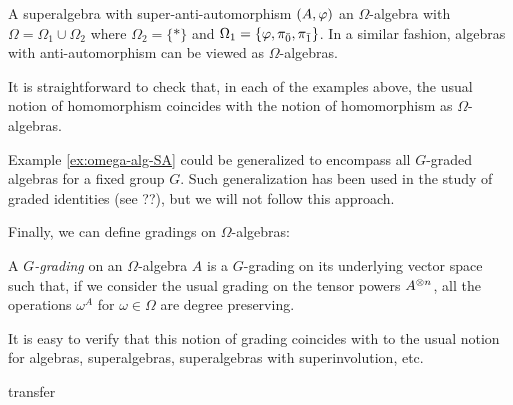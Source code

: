 
\begin{ex}
	A superalgebra with super-anti-automorphism $(A, \varphi)$ an $\Omega$-algebra with $\Omega = \Omega_1 \cup \Omega_2$ where $\Omega_2 = \{ * \}$ and $\Omega_1 = \{ \varphi, \pi_{\bar 0}, \pi_{\bar 1} \}$.
	In a similar fashion, algebras with anti-automorphism can be viewed as $\Omega$-algebras.
\end{ex}

It is straightforward to check that, in each of the examples above, the usual notion of homomorphism coincides with the notion of homomorphism as $\Omega$-algebras.

\begin{remark}
	Example \ref{ex:omega-alg-SA} could be generalized to encompass all $G$-graded algebras for a fixed group $G$.
	Such generalization has been used in the study of graded identities (see ??), but we will not follow this approach.
\end{remark}

Finally, we can define gradings on $\Omega$-algebras:

\begin{defi}\label{def:grds-on-Omega-algebras}
	A \emph{$G$-grading} on an $\Omega$-algebra $A$ is a $G$-grading on its underlying vector space such that, if we consider the usual grading on the tensor powers $A^{\otimes n}$, all the operations $\omega^A$ for $\omega \in \Omega$ are degree preserving.
\end{defi}

It is easy to verify that this notion of grading coincides with to the usual notion for algebras, superalgebras, superalgebras with superinvolution, etc.



\begin{thm}\label{thm:transfer-of-gradings}
    transfer
\end{thm}